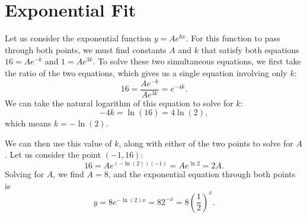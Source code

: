 \documentclass{article}
\begin{document}
\section{Exponential Fit}
\label{sec: exponential fit}

Let us consider the exponential function $y = A e^{k x}$.  For this function
to pass through both points, we must find constants $A$ and $k$ that satisfy
both equations $16 = A e^{-k}$ and $1 = A e^{3 k}$.  To solve these two
simultaneous equations, we first take the ratio of the two equations, which
gives us a single equation involving only $k$:
$$
	16
	= \frac{A e^{-k}}{A e^{3 k}}
	= e^{-4 k}
	.
$$
We can take the natural logarithm of this equation to solve for $k$:
$$
	-4k = \ln(16) = 4 \ln (2)
	,
$$
which means $k = - \ln(2)$.

We can then use this value of $k$, along with either of the two points to
solve for $A$.  Let us consider the point $(-1, 16)$:
$$
	16 = A e^{(-\ln(2))(-1)} = A e^{\ln{2}} = 2 A
	.
$$
Solving for $A$, we find $A = 8$, and the exponential equation through both
points is
$$
	y
	= 8 e^{-\ln(2) x}
	= 8 2^{-x}
	= 8 \left( \frac{1}{2} \right)^x
	.
$$

 
\end{document}
